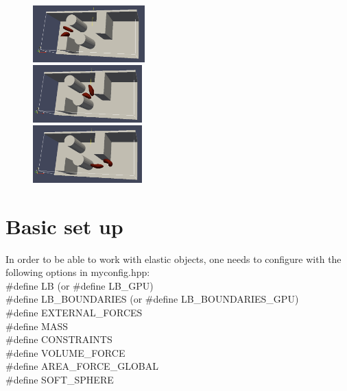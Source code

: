 \documentclass[
a4paper,                        %
11pt,                           %
twoside,                        %
footsepline,                    %
headsepline,                    %
headexclude,                    %
footexclude,                    %
pagesize,                       %
]{scrartcl}
\begin{document}
\begin{figure}[htbp]
  \hfill
  \begin{minipage}[t]{.32\textwidth}

      \includegraphics[width=4.3cm,right]{figures/1.png}

  \end{minipage}
  \hfill
  \begin{minipage}[t]{.32\textwidth}
   \begin{center}  
      \includegraphics[width=4.2cm]{figures/2.png}     
    \end{center}
  \end{minipage}
  \hfill
  \begin{minipage}[t]{.32\textwidth}

      \includegraphics[width=4.2cm,left]{figures/3.png} 

  \end{minipage}
  \hfill
\end{figure} 

\section{Basic set up}

In order to be able to work with elastic objects, one needs to configure \es with the following options in myconfig.hpp:\\
\#define LB (or \#define LB\_GPU)\\
\#define LB\_BOUNDARIES (or \#define LB\_BOUNDARIES\_GPU)\\
\#define EXTERNAL\_FORCES\\
\#define MASS\\
\#define CONSTRAINTS\\
\#define VOLUME\_FORCE\\
\#define AREA\_FORCE\_GLOBAL\\
\#define SOFT\_SPHERE\\
\end{document}
